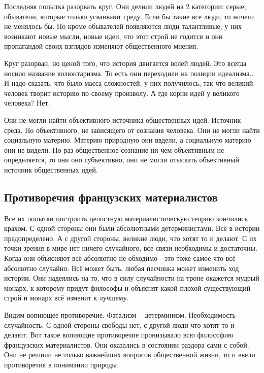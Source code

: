 Последняя попытка разорвать круг. Они делили людей на 2 категории: серые, обыватели, которые только усваивают среду. Если бы такие все люди, то ничего не менялось бы. Но кроме обывателей появляются люди талантливые, у них возникают новые мысли, новые идеи, что этот строй не годится и они пропагандой своих взглядов изменяют общественного мнения.

Круг разорван, но ценой того, что история двигается волей людей. Это всегда носило название волюнтаризма. То есть они переходили на позиции идеализма.. И надо сказать, что было масса сложностей, у них получилось, так что великий человек творит историю по своему произволу. А где корни идей у великого человека? Нет.

    Они не могли найти объективного источника общественных идей. Источник – среда. Но объективного, не зависящего от сознания человека. Они не могли найти социальную материю. Материю природную они ввдели, а социальную материю они не видели. Но раз общественное сознание ни чем объективным не определяется, то они оно субъективно, они не могли отыскать объективный источник общественных идей.

\subsection{Противоречия французских материалистов}

Все их попытки построить целостную материалистическую теорию кончились крахом. С одной стороны они были абсолютными детерминистами. Всё в истории предопределено. А с другой стороны, великие люди, что хотят то и делают. С их точки зрения в мире нет ничего случайного, все связи необходимы и достаточны. Когда они объясняют всё абсолютно не обходимо - это тоже самое что всё абсолютно случайно. Всё может быть, любая песчинка может изменить ход истории. Они надеялись на то, что в силу случайности на троне окажется мудрый монарх, к которому придут философы и объяснят какой плохой существующий строй и монарх всё изменит к лучшему.

    Видим вопиющее противоречие. Фатализм – детерминизм. Необходимость – случайность. С одной стороны свободы нет, с другой люди что хотят то и делают. Вот такое вопиющие противоречие пронизывало всю философию французских материалистов. Они оказались в состоянии раздора сами с собой. Они не решили не только важнейших вопросов общественной жизни, то и ввели противоречия в понимании природы.

